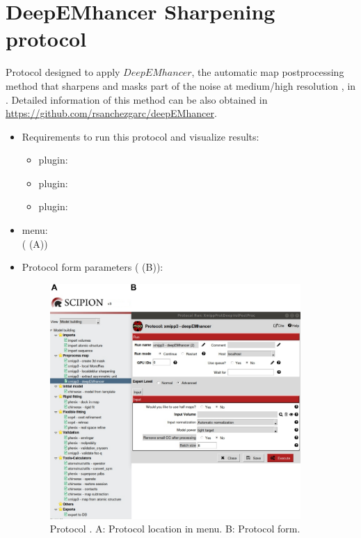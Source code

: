 \section{DeepEMhancer Sharpening protocol}
\label{app:deepEMhancerSharpening}%

Protocol designed to apply $DeepEMhancer$, the automatic map postprocessing method that sharpens and masks part of the noise at medium/high resolution \citep{Sanchez-Garcia2020.06.12.148296}, in \scipion. Detailed information of this method can be also obtained in \url{https://github.com/rsanchezgarc/deepEMhancer}.

\begin{itemize}
 \item Requirements to run this protocol and visualize results:
    \begin{itemize}
        \item \scipion plugin: 
        \item \scipion plugin: 
        \item \scipion plugin: 
    \end{itemize}
 \item \scipion menu:\\
   ( (A))
  
 \item Protocol form parameters ( (B)):
  
    \begin{figure}[H]
     \centering 
     \captionsetup{width=.9\linewidth} 
     \includegraphics[width=0.90\textwidth]{Images_appendix/Fig303}
     \caption{Protocol . A: Protocol location in \scipion menu. B: Protocol form.}
     \label{fig:app_deepEMhancer_1}
    \end{figure}
    

\end{itemize}
